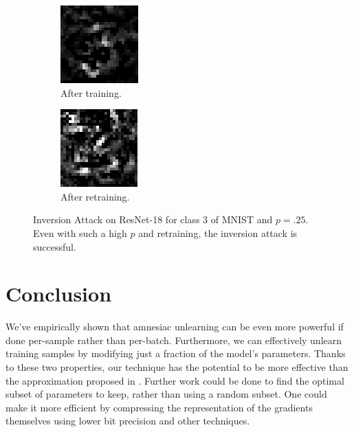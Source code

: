 \documentclass{article}
\begin{document}
\begin{figure}
    \centering
    \begin{subfigure}[b]{0.23\textwidth}
        \centering
        \includegraphics[width=.48\textwidth]{trained_single.png}
        \caption{After training.}
    \end{subfigure}%
    \begin{subfigure}[b]{0.23\textwidth}
        \centering
        \includegraphics[width=.48\textwidth]{retrained_single.png}
        \caption{After retraining.}
    \end{subfigure}
    \caption{Inversion Attack on ResNet-18 for class $3$ of MNIST and $p=.25$. Even with such a high $p$ and retraining, the inversion attack is successful.}
    \label{fig:inversion}
\end{figure}

\section{Conclusion}
We've empirically shown that amnesiac unlearning can be even more powerful if done per-sample rather than per-batch. Furthermore, we can effectively unlearn training samples by modifying just a fraction of the model's parameters. Thanks to these two properties, our technique has the potential to be more effective than the approximation proposed in \cite{gogineni2024efficient}. Further work could be done to find the optimal subset of parameters to keep, rather than using a random subset. One could make it more efficient by compressing the representation of the gradients themselves using lower bit precision and other techniques.



\end{document}
